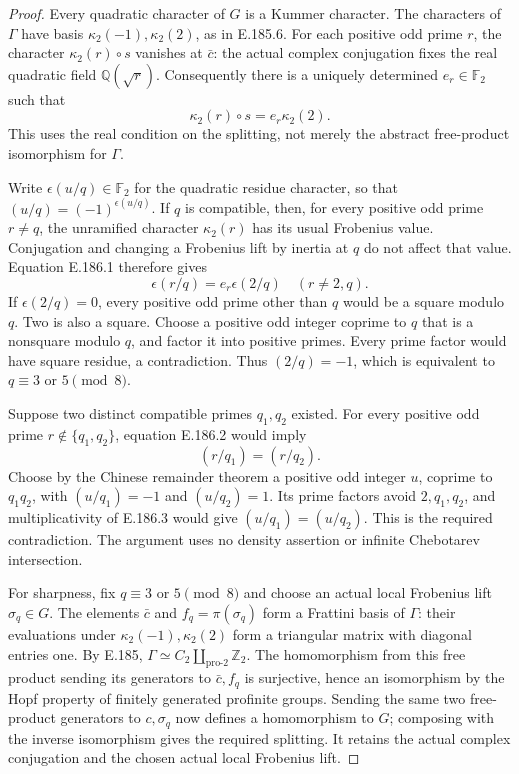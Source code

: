 \begin{proof}
Every quadratic character of \(G\) is a Kummer character.
The characters of \(\Gamma\) have basis
\(\kappa_2(-1),\kappa_2(2)\), as in E.185.6.
For each positive odd prime \(r\), the character
\(\kappa_2(r)\circ s\) vanishes at \(\bar c\): the
actual complex conjugation fixes the real quadratic field
\(\mathbb Q(\sqrt r)\). Consequently there is a uniquely
determined \(e_r\in\mathbb F_2\) such that
\[
                   \kappa_2(r)\circ s=e_r\kappa_2(2).
 \tag{E.186.1}
\]
This uses the real condition on the splitting, not merely
the abstract free-product isomorphism for \(\Gamma\).

Write \(\epsilon(u/q)\in\mathbb F_2\) for the quadratic
residue character, so that
\((u/q)=(-1)^{\epsilon(u/q)}\). If \(q\) is compatible,
then, for every positive odd prime \(r\ne q\), the
unramified character \(\kappa_2(r)\) has its usual
Frobenius value. Conjugation and changing a Frobenius lift
by inertia at \(q\) do not affect that value. Equation
E.186.1 therefore gives
\[
                 \epsilon(r/q)=e_r\epsilon(2/q)
                            \quad(r\ne2,q).
 \tag{E.186.2}
\]
If \(\epsilon(2/q)=0\), every positive odd prime other
than \(q\) would be a square modulo \(q\). Two is also
a square. Choose a positive odd integer coprime to \(q\)
that is a nonsquare modulo \(q\), and factor it into
positive primes. Every prime factor would have square
residue, a contradiction. Thus \((2/q)=-1\), which is
equivalent to \(q\equiv3\) or \(5\pmod8\).

Suppose two distinct compatible primes \(q_1,q_2\) existed.
For every positive odd prime \(r\notin\{q_1,q_2\}\),
equation E.186.2 would imply
\[
                         (r/q_1)=(r/q_2).
 \tag{E.186.3}
\]
Choose by the Chinese remainder theorem a positive odd
integer \(u\), coprime to \(q_1q_2\), with
\((u/q_1)=-1\) and \((u/q_2)=1\).
Its prime factors avoid \(2,q_1,q_2\), and multiplicativity
of E.186.3 would give \((u/q_1)=(u/q_2)\). This is the
required contradiction. The argument uses no density
assertion or infinite Chebotarev intersection.

For sharpness, fix \(q\equiv3\) or \(5\pmod8\) and
choose an actual local Frobenius lift \(\sigma_q\in G\).
The elements \(\bar c\) and \(f_q=\pi(\sigma_q)\)
form a Frattini basis of \(\Gamma\): their evaluations
under \(\kappa_2(-1),\kappa_2(2)\) form a triangular
matrix with diagonal entries one. By E.185,
\(\Gamma\simeq C_2\amalg_{\mathrm{pro}\text{-}2}\mathbb Z_2\).
The homomorphism from this free product sending its
generators to \(\bar c,f_q\) is surjective, hence an
isomorphism by the Hopf property of finitely generated
profinite groups. Sending the same two free-product
generators to \(c,\sigma_q\) now defines a homomorphism
to \(G\); composing with the inverse isomorphism gives
the required splitting. It retains the actual complex
conjugation and the chosen actual local Frobenius lift.


\end{proof}
